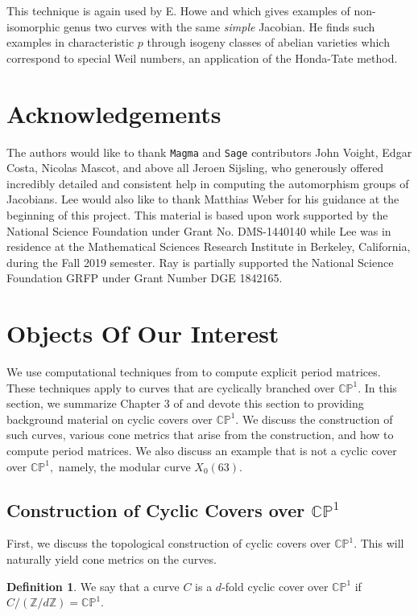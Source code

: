 \documentclass[12pt,reqno]{amsart}
\newcommand{\Z}{\mathbb{Z}}
\theoremstyle{definition}
\newtheorem{defn}{Definition}
\theoremstyle{remark}
\begin{document}
This technique is again used by E. Howe \cite{howe1} and \cite{howe2} which gives examples of non-isomorphic genus two curves with the same \textit{simple} Jacobian. He finds such examples in characteristic $p$ through isogeny classes of abelian varieties which correspond to special Weil numbers, an application of the Honda-Tate method. 

\section*{Acknowledgements} 
The authors would like to thank \texttt{Magma} and \texttt{Sage} contributors John Voight, Edgar Costa, Nicolas Mascot, and above all Jeroen Sijsling, who generously offered incredibly detailed and consistent help in computing the automorphism groups of Jacobians. Lee would also like to thank Matthias Weber for his guidance at the beginning of this project. This material is based upon work supported by the National Science Foundation under Grant No. DMS-1440140 while Lee was in residence at the Mathematical Sciences Research Institute in Berkeley, California, during the Fall 2019 semester. Ray is partially supported the National Science Foundation GRFP under Grant Number DGE 1842165.


\section{Objects Of Our Interest}
\label{sec: dthesis}
We use computational techniques from \cite{dthesis} to compute explicit period matrices. These techniques apply to curves that are cyclically branched over $\mathbb{C}\mathbb{P}^1.$ In this section, we summarize Chapter 3 of \cite{dthesis} and devote this section to providing background material on cyclic covers over $\mathbb{C}\mathbb{P}^1.$ We discuss the construction of such curves, various cone metrics that arise from the construction, and how to compute period matrices. We also discuss an example that is not a cyclic cover over $\mathbb{C}\mathbb{P}^1,$ namely, the modular curve $X_0(63).$

\subsection{Construction of Cyclic Covers over $\mathbb{C}\mathbb{P}^1$}
First, we discuss the topological construction of cyclic covers over $\mathbb{C}\mathbb{P}^1.$ This will naturally yield cone metrics on the curves.

\begin{defn} We say that a curve $C$ is a $d$-fold cyclic cover over $\mathbb{C}\mathbb{P}^1$ if $C / (\Z/ d \Z) = \mathbb{C}\mathbb{P}^1.$ \end{defn}
\end{document}
